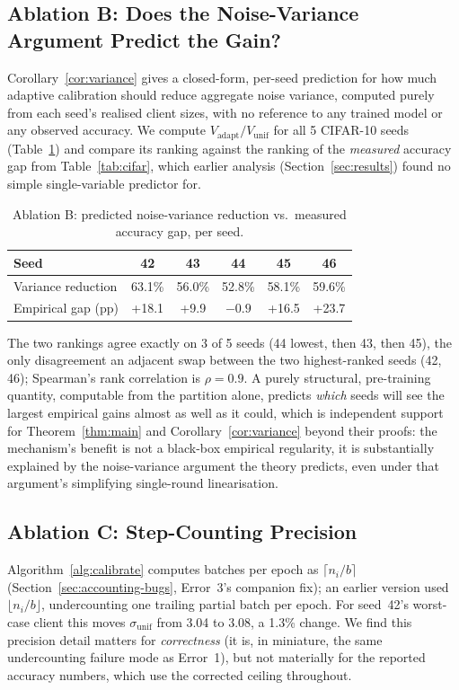 \documentclass[journal]{IEEEtran}
\begin{document}
\subsection{Ablation B: Does the Noise-Variance Argument Predict the Gain?}
Corollary~\ref{cor:variance} gives a closed-form, per-seed prediction
for how much adaptive calibration should reduce aggregate noise
variance, computed purely from each seed's realised client sizes, with
no reference to any trained model or any observed accuracy. We compute
$V_{\mathrm{adapt}}/V_{\mathrm{unif}}$ for all 5 CIFAR-10 seeds
(Table~\ref{tab:ablation-variance}) and compare its ranking against
the ranking of the \emph{measured} accuracy gap from
Table~\ref{tab:cifar}, which earlier analysis
(Section~\ref{sec:results}) found no simple single-variable predictor
for.

\begin{table}[t]
\centering
\caption{Ablation B: predicted noise-variance reduction vs.\ measured accuracy gap, per seed.}
\label{tab:ablation-variance}
\begin{tabular}{lccccc}
\toprule
Seed & 42 & 43 & 44 & 45 & 46 \\
\midrule
Variance reduction & 63.1\% & 56.0\% & 52.8\% & 58.1\% & 59.6\% \\
Empirical gap (pp) & +18.1 & +9.9 & $-0.9$ & +16.5 & +23.7 \\
\bottomrule
\end{tabular}
\end{table}

The two rankings agree exactly on 3 of 5 seeds (44 lowest, then 43,
then 45), the only disagreement an adjacent swap between the two
highest-ranked seeds (42, 46); Spearman's rank correlation is
$\rho=0.9$. A purely structural, pre-training quantity, computable
from the partition alone, predicts \emph{which} seeds will see the
largest empirical gains almost as well as it could, which is
independent support for Theorem~\ref{thm:main} and
Corollary~\ref{cor:variance} beyond their proofs: the mechanism's
benefit is not a black-box empirical regularity, it is substantially
explained by the noise-variance argument the theory predicts, even
under that argument's simplifying single-round linearisation.

\subsection{Ablation C: Step-Counting Precision}
Algorithm~\ref{alg:calibrate} computes batches per epoch as
$\lceil n_i/b\rceil$ (Section~\ref{sec:accounting-bugs}, Error~3's
companion fix); an earlier version used $\lfloor n_i/b\rfloor$,
undercounting one trailing partial batch per epoch. For seed~42's
worst-case client this moves $\sigma_{\mathrm{unif}}$ from 3.04 to
3.08, a 1.3\% change. We find this precision detail matters for
\emph{correctness} (it is, in miniature, the same undercounting
failure mode as Error~1), but not materially for the reported
accuracy numbers, which use the corrected ceiling throughout.
\end{document}

